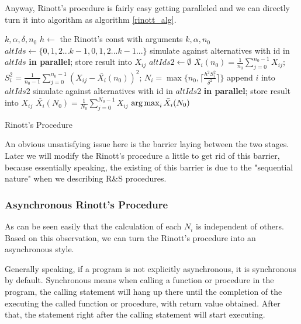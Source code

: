 Anyway, Rinott's procedure is fairly easy getting paralleled and we can directly turn it into algorithm as algorithm \ref{rinott_alg}.

\begin{algorithm}
\begin{algorithmic}[1]
\Require $k, \alpha, \delta, n_0$
\State $h \gets$ the Rinott's const with arguments $k, \alpha, n_0$
\State $altIds \gets \{0, 1, 2...k - 1, 0, 1, 2...k - 1...\}$ 
\State simulate against alternatives with id in $altIds$ \textbf{in parallel}; store result into $X_{ij}$
\State $altIds2 \gets \emptyset$
  \State $\bar{X_i}(n_0) = \frac{1}{n_0} \sum_{j=0}^{n_0 - 1}X_{ij}$;  $S_i^2 = \frac{1}{n_0 - 1} \sum_{j=0}^{n_0 - 1}(X_{ij} - \bar{X_i}(n_0))^2$;
  \State $N_i = \max\{n_0, \lceil \frac{h^2S_i^2}{\delta^2} \rceil\}$
    \State append $i$ into $altIds2$
  \EndFor
\EndFor
\State simulate against alternatives with id in $altIds2$ \textbf{in parallel}; store result into $X_{ij}$
  \State $\bar{X_i}(N_0) = \frac{1}{N_0} \sum_{j=0}^{N_0 - 1}X_{ij}$
\EndFor
\State \Return $\operatorname*{arg\,max}_{i}\bar{X_i}(N_0)$
\end{algorithmic}
\caption{Rinott's Procedure}
\label{rinott_alg}
\end{algorithm}

An obvious unsatisfying issue here is the barrier laying between the two stages. Later we will modify the Rinott's procedure a little to get rid of this barrier, because essentially speaking, the existing of this barrier is due to the "sequential nature" when we describing R\&S procedures.

\subsubsection{Asynchronous Rinott's Procedure}

As can be seen easily that the calculation of each $N_i$ is independent of others. Based on this observation, we can turn the Rinott's procedure into an asynchronous style.

Generally speaking, if a program is not explicitly asynchronous, it is synchronous by default. Synchronous means when calling a function or procedure in the program, the calling statement will hang up there until the completion of the executing the called function or procedure, with return value obtained. After that, the statement right after the calling statement will start executing.

